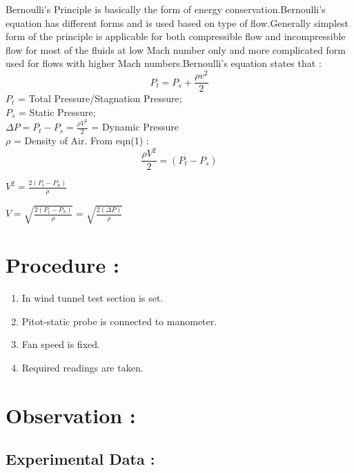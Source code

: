 \documentclass[12pt,a4paper]{article}
\begin{document}
Bernoulli's Principle is basically the form of energy conservation.Bernoulli's equation has different forms and is used based on type of flow.Generally simplest form of the principle is applicable for both compressible flow and incompressible flow for most of the fluids at low Mach number only and more complicated form used for flows with higher Mach numbers.Bernoulli's equation states that :
\begin{equation}
    P_t = P_s + \frac{\rho v^{2}}{2}
\end{equation}
$P_t$ = Total Pressure/Stagnation Pressure;\\
$P_s$ = Static Pressure;\\ \vspace{2mm}
$\Delta P = P_t - P_s = \frac{\rho V^{2}}{2}$ = Dynamic Pressure\\
$\rho$ = Density of Air.
From eqn(1) : 
\begin{equation}
    \frac{\rho V^{2}}{2} = (P_t - P_s)
\end{equation}
\begin{center}
    $V^{2} = \frac{2(P_t - P_S)}{\rho}$ 
\end{center}
\begin{center}
    $V = \sqrt{\frac{2(P_t - P_S)}{\rho}} = \sqrt{\frac{2 (\Delta P)}{\rho}}$
\end{center}
   




\section{Procedure :}
\begin{enumerate}
    \item In wind tunnel test section is set.
    \item Pitot-static probe is connected to manometer.
    \item Fan speed is fixed.
    \item Required readings are taken.
\end{enumerate}






\section{Observation :}



\subsection{Experimental Data : } 
\end{document}
